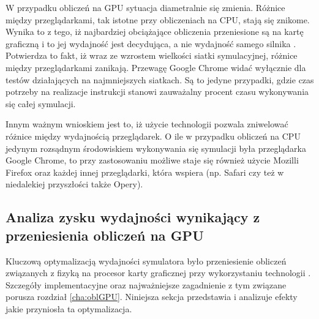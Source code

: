 W przypadku obliczeń na GPU sytuacja diametralnie się zmienia. Różnice między
przeglądarkami, tak istotne przy obliczeniach na CPU, stają się znikome.
Wynika to z tego, iż najbardziej obciążające obliczenia przeniesione są na
kartę graficzną i to jej wydajność jest decydująca, a nie wydajność samego
silnika .  Potwierdza to fakt, iż wraz ze wzrostem wielkości
siatki symulacyjnej, różnice między przeglądarkami zanikają. Przewagę Google
Chrome widać wyłącznie dla testów działających na najmniejszych siatkach. Są
to jedyne przypadki, gdzie czas potrzeby na realizacje instrukcji \js
stanowi zauważalny procent czasu wykonywania się całej symulacji.

Innym ważnym wnioskiem jest to, iż użycie technologii  pozwala
zniwelować różnice między wydajnością przeglądarek. O ile w przypadku obliczeń
na CPU jedynym rozsądnym środowiskiem wykonywania się symulacji była
przeglądarka Google Chrome, to przy zastosowaniu  możliwe staje się
również użycie Mozilli Firefox oraz każdej innej przeglądarki, która wspiera
 (np. Safari czy też w niedalekiej przyszłości także Opery).

\subsection{Analiza zysku wydajności wynikający z przeniesienia obliczeń na GPU}
\label{sec:analizaGPUCPU}

Kluczową optymalizacją wydajności symulatora \en było przeniesienie obliczeń
związanych z fizyką na procesor karty graficznej przy wykorzystaniu technologii
. Szczegóły implementacyjne oraz najważniejsze zagadnienie z tym
związane porusza rozdział \ref{cha:oblGPU}. Niniejsza sekcja przedstawia i
analizuje efekty jakie przyniosła ta optymalizacja.

